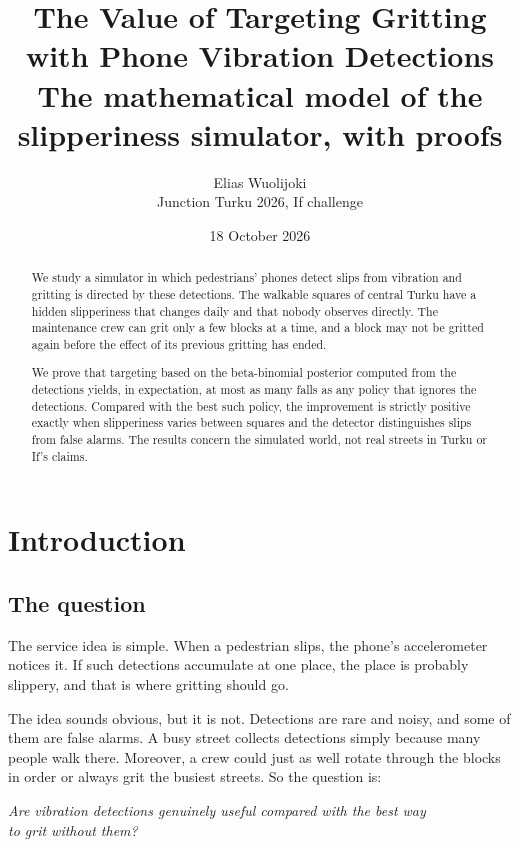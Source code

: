 \documentclass[11pt,a4paper]{article}
\title{\textbf{The Value of Targeting Gritting\\ with Phone Vibration Detections}\\[6pt]
\large The mathematical model of the slipperiness simulator, with proofs}
\author{Elias Wuolijoki\\[2pt] \small Junction Turku 2026, If challenge}
\date{18 October 2026}
\theoremstyle{plain}
\theoremstyle{definition}
\theoremstyle{remark}
\newcommand{\1}{\mathbf{1}}
\begin{document}
\maketitle

\begin{abstract}
\noindent
We study a simulator in which pedestrians' phones detect slips from vibration and
gritting is directed by these detections. The walkable squares of central Turku
have a hidden slipperiness that changes daily and that nobody observes directly.
The maintenance crew can grit only a few blocks at a time, and a block may not be
gritted again before the effect of its previous gritting has ended.

We prove that targeting based on the beta-binomial posterior computed from the
detections yields, in expectation, at most as many falls as any policy that
ignores the detections. Compared with the best such policy, the improvement is
strictly positive exactly when slipperiness varies between squares and the
detector distinguishes slips from false alarms. The results concern the simulated
world, not real streets in Turku or If's claims.
\end{abstract}

\vspace{4pt}
\setcounter{tocdepth}{1}
{\small\tableofcontents}
\newpage

\section{Introduction}

\subsection{The question}

The service idea is simple. When a pedestrian slips, the phone's accelerometer
notices it. If such detections accumulate at one place, the place is probably
slippery, and that is where gritting should go.

The idea sounds obvious, but it is not. Detections are rare and noisy, and some
of them are false alarms. A busy street collects detections simply because many
people walk there. Moreover, a crew could just as well rotate through the blocks
in order or always grit the busiest streets. So the question is:

\begin{center}
\emph{Are vibration detections genuinely useful compared with the best way\\ to grit without them?}
\end{center}
\end{document}

